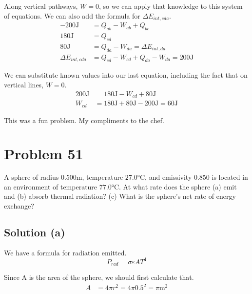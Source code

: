 \documentclass[12pt]{article}
\begin{document}
            Along vertical pathways, $W = 0$, so we can apply that knowledge to this system of equations.
            We can also add the formula for $\Delta E_{int,cda}$. 
            \begin{align}
                -200\unit{\joule}   &=  Q_{ab} - W_{ab} + Q_{bc}\\
                180 \unit{\joule}   &=  Q_{cd}\\
                80 \unit{\joule}    &=  Q_{da} - W_{da} = \Delta E_{int,da}\\
                \Delta E_{int,cda}  &=  Q_{cd} - W_{cd} + Q_{da} - W_{da} = 200 \unit{\joule}
            \end{align}

            We can substitute known values into our last equation, including the fact that on vertical lines, $W = 0$.
            \begin{align}
                200 \unit{\joule}   &=  180 \unit{\joule} - W_{cd} + 80 \unit{\joule}\\
                W_{cd}  &=  180 \unit{\joule} + 80 \unit{\joule} - 200 \unit{\joule} = \boxed{60 \unit{\joule}}
            \end{align}

            This was a fun problem. 
            My compliments to the chef. 

    \pagebreak
    \section{Problem 51}
        A sphere of radius $0.500\unit{\meter}$, temperature $27.0\unit{\celsius}$, and emissivity 0.850 is located in an environment of temperature $77.0\unit{\celsius}$.
        At what rate does the sphere (a) emit and (b) absorb thermal radiation? 
        (c) What is the sphere's net rate of energy exchange?

        \subsection{Solution (a)}
            We have a formula for radiation emitted. 
            \begin{equation}
                P_{rad} =   \sigma \varepsilon A T^4
            \end{equation}

            Since A is the area of the sphere, we should first calculate that. 
            \begin{align}
                A   &=  4\pi r^2
                    =   4\pi 0.5^2
                    =   \pi \unit{\meter^2}
            \end{align}
\end{document}
